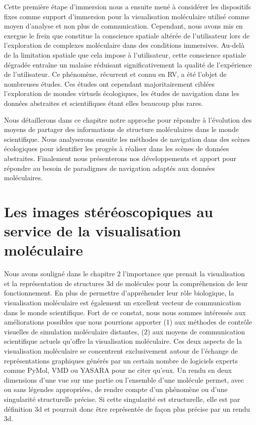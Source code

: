 Cette première étape d'immersion nous a ensuite mené à considérer les dispositifs fixes comme support d'immersion pour la visualisation moléculaire utilisé comme moyen d'analyse et non plus de communication. 
Cependant, nous avons mis en exergue le frein que constitue la conscience spatiale altérée de l'utilisateur lors de l'exploration de complexes moléculaire dans des conditions immersives. Au-delà de la limitation spatiale que cela impose à l'utilisateur, cette conscience spatiale dégradée entraîne un malaise réduisant significativement la qualité de l'expérience de l'utilisateur.
Ce phénomène, récurrent et connu en RV, a été l'objet de nombreuses études. Ces études ont cependant majoritairement ciblées l'exploration de mondes virtuels écologiques, les études de navigation dans les données abstraites et scientifiques étant elles beaucoup plus rares. 

Nous détaillerons dans ce chapitre notre approche pour répondre à l'évolution des moyens de partager des informations de structure moléculaires dans le monde scientifique. Nous analyserons ensuite les méthodes de navigation dans des scènes écologiques pour identifier les progrès à réaliser dans les scènes de données abstraites. Finalement nous présenterons nos développements et apport pour répondre au besoin de paradigmes de navigation adaptés aux données moléculaires.

\section{Les images stéréoscopiques au service de la visualisation moléculaire}

Nous avons souligné dans le chapitre 2 l'importance que prenait la visualisation et la représentation de structures 3d de molécules pour la compréhension de leur fonctionnement. En plus de permettre d'appréhender leur rôle biologique, la visualisation moléculaire est également un excellent vecteur de communication dans le monde scientifique. Fort de ce constat, nous nous sommes intéressés aux améliorations possibles que nous pourrions apporter (1) aux méthodes de contrôle visuelles de simulation moléculaire distantes, (2) aux moyens de communication scientifique actuels qu'offre la visualisation moléculaire. Ces deux aspects de la visualisation moléculaire se concentrent exclusivement autour de l'échange de représentations graphiques générés par un certain nombre de logiciels experts comme PyMol, VMD ou YASARA pour ne citer qu'eux. Un rendu en deux dimensions d'une vue sur une partie ou l'ensemble d'une molécule permet, avec ou sans légendes appropriées, de rendre compte d'un phénomène ou d'une singularité structurelle précise. Si cette singularité est structurelle, elle est par définition 3d et pourrait donc être représentée de façon plus précise par un rendu 3d.

